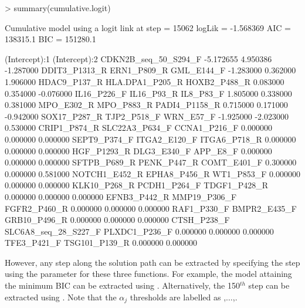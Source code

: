 \documentclass[article, shortclass, nojss]{jss}
\begin{document}
\begin{Schunk}
\begin{Sinput}
> summary(cumulative.logit)
\end{Sinput}
\begin{Soutput}
Cumulative model using a  logit  link 
at step    =  15062 
logLik     =  -1.568369 
AIC        =  138315.1 
BIC        =  151280.1 

       (Intercept):1        (Intercept):2 CDKN2B_seq_50_S294_F 
           -5.172655             4.950386            -1.287000 
       DDIT3_P1313_R          ERN1_P809_R           GML_E144_F 
           -1.283000             0.362000             1.906000 
        HDAC9_P137_R      HLA.DPA1_P205_R         HOXB2_P488_R 
            0.083000             0.354000            -0.076000 
         IL16_P226_F           IL16_P93_R            IL8_P83_F 
            1.805000             0.338000             0.381000 
          MPO_E302_R           MPO_P883_R        PADI4_P1158_R 
            0.715000             0.171000            -0.942000 
        SOX17_P287_R          TJP2_P518_F            WRN_E57_F 
           -1.925000            -2.023000             0.530000 
        CRIP1_P874_R       SLC22A3_P634_F         CCNA1_P216_F 
            0.000000             0.000000             0.000000 
        SEPT9_P374_F         ITGA2_E120_F         ITGA6_P718_R 
            0.000000             0.000000             0.000000 
         HGF_P1293_R          DLG3_E340_F             APP_E8_F 
            0.000000             0.000000             0.000000 
        SFTPB_P689_R          PENK_P447_R          COMT_E401_F 
            0.300000             0.000000             0.581000 
       NOTCH1_E452_R         EPHA8_P456_R           WT1_P853_F 
            0.000000             0.000000             0.000000 
        KLK10_P268_R         PCDH1_P264_F         TDGF1_P428_R 
            0.000000             0.000000             0.000000 
        EFNB3_P442_R         MMP19_P306_F         FGFR2_P460_R 
            0.000000             0.000000             0.000000 
         RAF1_P330_F         BMPR2_E435_F         GRB10_P496_R 
            0.000000             0.000000             0.000000 
         CTSH_P238_F SLC6A8_seq_28_S227_F        PLXDC1_P236_F 
            0.000000             0.000000             0.000000 
         TFE3_P421_F        TSG101_P139_R 
            0.000000             0.000000 
\end{Soutput}
\end{Schunk}
However, any step along the solution path can be extracted by specifying the step using the  parameter for these three functions. For example, the model attaining the minimum BIC can be extracted using 
\newline {}. \newline Alternatively, the 150$^{th}$ step can be extracted using \newline {}. \newline Note that the $\alpha_j$ thresholds are labelled as ,$\ldots$,.
\end{document}
